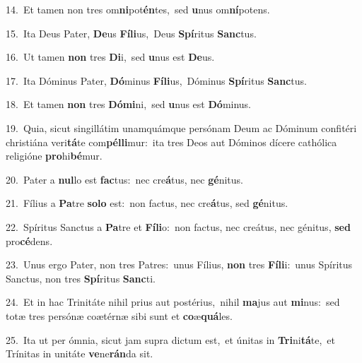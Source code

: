 {\numbfont\textcolor{\numbcolor}{14.}}~Et tamen non tres om\-\textbf{ni}\-pot\-\textbf{én}\-tes,~\star sed \textbf{u}\-nus om\-\textbf{ní}\-potens.\par
{\numbfont\textcolor{\numbcolor}{15.}}~Ita Deus Pater, \textbf{De}\-us \textbf{Fí}\-\textbf{li}us,~\star Deus \textbf{Spí}\-ritus \textbf{Sanc}\-tus.\par
{\numbfont\textcolor{\numbcolor}{16.}}~Ut tamen \textbf{non} tres \textbf{Di}\-i,~\star sed \textbf{u}\-nus est \textbf{De}\-us.\par
{\numbfont\textcolor{\numbcolor}{17.}}~Ita Dóminus Pater, \textbf{Dó}\-minus \textbf{Fí}\-\textbf{li}us,~\star Dóminus \textbf{Spí}\-ritus \textbf{Sanc}\-tus.\par
{\numbfont\textcolor{\numbcolor}{18.}}~Et tamen \textbf{non} tres \textbf{Dó}\-\textbf{mi}ni,~\star sed \textbf{u}\-nus est \textbf{Dó}\-minus.\par
{\numbfont\textcolor{\numbcolor}{19.}}~Quia, sicut singillátim unamquámque persónam Deum ac Dóminum confitéri christiána veri\-\textbf{tá}\-te com\-\textbf{pél}\-\textbf{li}mur:~\star ita tres Deos aut Dóminos dícere cathólica religióne \textbf{pro}\-hi\-\textbf{bé}\-mur.\par
{\numbfont\textcolor{\numbcolor}{20.}}~Pater a \textbf{nul}\-lo est \textbf{fac}\-tus:~\star nec cre\-\textbf{á}\-tus, nec \textbf{gé}\-nitus.\par
{\numbfont\textcolor{\numbcolor}{21.}}~Fílius a \textbf{Pa}\-tre \textbf{so}\-\textbf{lo} est:~\star non factus, nec cre\-\textbf{á}\-tus, sed \textbf{gé}\-nitus.\par
{\numbfont\textcolor{\numbcolor}{22.}}~Spíritus Sanctus a \textbf{Pa}\-tre et \textbf{Fí}\-\textbf{li}o:~\star non factus, nec creátus, nec génitus, \textbf{sed} pro\-\textbf{cé}\-dens.\par
{\numbfont\textcolor{\numbcolor}{23.}}~Unus ergo Pater, non tres Patres:~\dagger unus Fílius, \textbf{non} tres \textbf{Fí}\-\textbf{li}i:~\star unus Spíritus Sanctus, non tres \textbf{Spí}\-ritus \textbf{Sanc}\-ti.\par
{\numbfont\textcolor{\numbcolor}{24.}}~Et in hac Trinitáte nihil prius aut postérius,~\dagger nihil \textbf{ma}\-jus aut \textbf{mi}\-nus:~\star sed totæ tres persónæ coætérnæ sibi sunt et \textbf{co}\-æ\-\textbf{quá}\-les.\par
{\numbfont\textcolor{\numbcolor}{25.}}~Ita ut per ómnia, sicut jam supra dictum est,~\dagger et únitas in \textbf{Tri}\-ni\-\textbf{tá}\-te,~\star et Trínitas in unitáte \textbf{ve}\-ne\-\textbf{rán}\-da sit.\par
